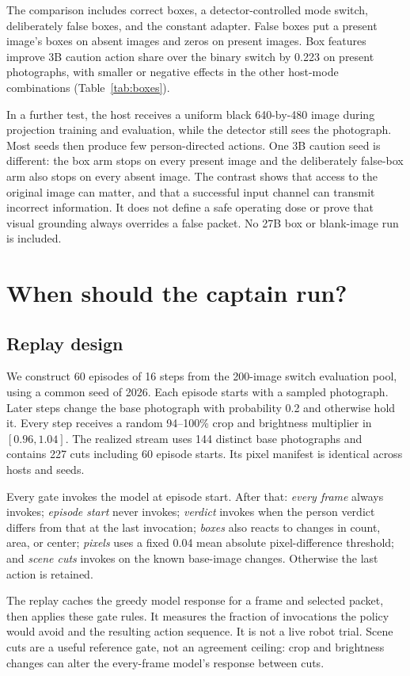 \documentclass[10pt]{article}
\begin{document}
The comparison includes correct boxes, a detector-controlled mode
switch, deliberately false boxes, and the constant adapter.
False boxes put a present image's boxes on absent images and zeros
on present images. Box features improve 3B caution action share
over the binary switch by 0.223 on present photographs, with
smaller or negative effects in the other host-mode combinations
(Table~\ref{tab:boxes}).

In a further test, the host receives a uniform black 640-by-480
image during projection training and evaluation, while the
detector still sees the photograph. Most seeds then produce few
person-directed actions. One 3B caution seed is different:
the box arm stops on every present image and the deliberately
false-box arm also stops on every absent image. The contrast shows
that access to the original image can matter, and that a successful
input channel can transmit incorrect information. It does not
define a safe operating dose or prove that visual grounding
always overrides a false packet. No 27B box or blank-image run is
included.

\section{When should the captain run?}
\subsection{Replay design}
We construct 60 episodes of 16 steps from the 200-image switch
evaluation pool, using a common seed of 2026. Each episode starts
with a sampled photograph. Later steps change the base photograph
with probability 0.2 and otherwise hold it. Every step receives
a random 94--100\% crop and brightness multiplier in
$[0.96,1.04]$. The realized stream uses 144 distinct base photographs
and contains 227 cuts including 60 episode starts. Its pixel
manifest is identical across hosts and seeds.

Every gate invokes the model at episode start. After that:
\emph{every frame} always invokes; \emph{episode start} never invokes;
\emph{verdict} invokes when the person verdict differs from that
at the last invocation; \emph{boxes} also reacts to changes in
count, area, or center; \emph{pixels} uses a fixed 0.04 mean
absolute pixel-difference threshold; and \emph{scene cuts}
invokes on the known base-image changes.
Otherwise the last action is retained.

The replay caches the greedy model response for a frame and selected
packet, then applies these gate rules. It measures the fraction of
invocations the policy would avoid and the resulting action sequence.
It is not a live robot trial. Scene cuts are a useful reference gate,
not an agreement ceiling: crop and brightness changes can alter the
every-frame model's response between cuts.
\end{document}
